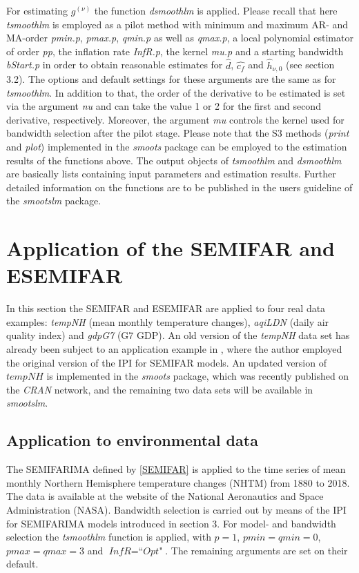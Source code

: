 \documentclass[12pt]{article}
\begin{document}
For estimating $g^{(\nu)}$ the function \textit{dsmoothlm} is applied. Please recall that here \textit{tsmoothlm} is employed as a pilot method with minimum and maximum AR- and MA-order \textit{pmin.p}, \textit{pmax.p}, \textit{qmin.p} as well as \textit{qmax.p}, a local polynomial estimator of order \textit{pp}, the inflation rate \textit{InfR.p}, the kernel \textit{mu.p} and a starting bandwidth \textit{bStart.p} in order to obtain reasonable estimates for $\hat{d}$, $\hat{c_f}$ and $\hat{h}_{\nu,0}$ (see section 3.2). The options and default settings for these arguments are the same as for \textit{tsmoothlm}. In addition to that, the order of the derivative to be estimated is set via the argument \textit{nu} and can take the value 1 or 2 for the first and second derivative, respectively. Moreover, the argument \textit{mu} controls the kernel used for bandwidth selection after the pilot stage. Please note that the S3 methods (\textit{print} and \textit{plot}) implemented in the \textit{smoots} package can be employed to the estimation results of the functions above. The output objects of \textit{tsmoothlm} and \textit{dsmoothlm} are basically lists containing input parameters and estimation results. Further detailed information on the functions are to be published in the users guideline of the \textit{smootslm} package.       


\section{Application of the SEMIFAR and ESEMIFAR}
In this section the SEMIFAR and ESEMIFAR are applied to four real data examples: \textit{tempNH} (mean monthly temperature changes), \textit{aqiLDN} (daily air quality index) and \textit{gdpG7} (G7 GDP). An old version of the \textit{tempNH} data set has already been subject to an application example in \citet{feng2007asymptotic}, where the author employed the original version of the IPI for SEMIFAR models. An updated version of $\textit{tempNH}$ is implemented in the \textit{smoots} package, which was recently published on the \textit{CRAN} network, and the remaining two data sets will be available in \textit{smootslm}. 

\subsection{Application to environmental data}
The SEMIFARIMA defined by \eqref{SEMIFAR} is applied to the time series of mean monthly Northern Hemisphere temperature changes (NHTM) from 1880 to 2018. The data is available at the website of the National Aeronautics and Space Administration (NASA). Bandwidth selection is carried out by means of the IPI for SEMIFARIMA models introduced in section 3. For model- and bandwidth selection the \textit{tsmoothlm} function is applied, with $\textit{p} = 1$, $\textit{pmin} = \textit{qmin} = 0$, $\textit{pmax} = \textit{qmax} = 3$ and $\textit{InfR} = \textit{``Opt"}$. The remaining arguments are set on their default. 
\end{document}
